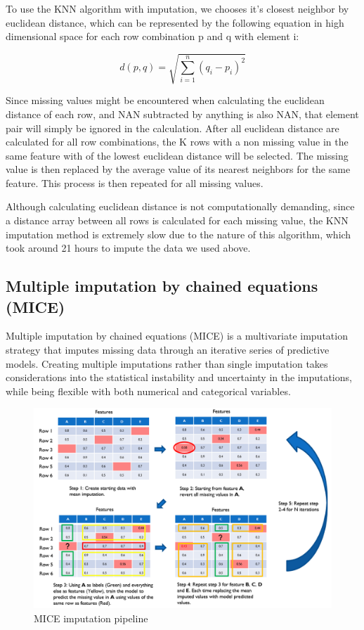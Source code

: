 \documentclass{l4proj}
\begin{document}
To use the KNN algorithm with imputation, we chooses it's closest neighbor by euclidean distance, which can be represented by the following equation in high dimensional space for each row combination {p} and {q} with element {i}:

 \[d\left( p,q\right)   = \sqrt {\sum _{i=1}^{n}  \left( q_{i}-p_{i}\right)^2 }\]
 
 Since missing values might be encountered when calculating the euclidean distance of each row, and NAN subtracted by anything is also NAN, that element pair will simply be ignored in the calculation. After all euclidean distance are calculated for all row combinations, the K rows with a non missing value in the same feature with of the lowest euclidean distance will be selected. The missing value is then replaced by the average value of its nearest neighbors for the same feature. This process is then repeated for all missing values. 
 
 Although calculating euclidean distance is not computationally demanding, since a distance array between all rows is calculated for each missing value, the KNN imputation method is extremely slow due to the nature of this algorithm, which took around 21 hours to impute the data we used above. 




\subsection{Multiple imputation by chained equations (MICE)}

Multiple imputation by chained equations (MICE) is a multivariate imputation strategy that imputes missing data through an iterative series of predictive models. Creating multiple imputations rather than single imputation takes considerations into the statistical instability and uncertainty in the imputations, while being flexible with both numerical and categorical variables.

 \begin{figure}[h!]
  \caption{MICE imputation pipeline}
  \includegraphics[width=\textwidth]{dissertation/Latex/images/Imputation Figures/MICE imputed.PNG}
\end{figure}
\end{document}
